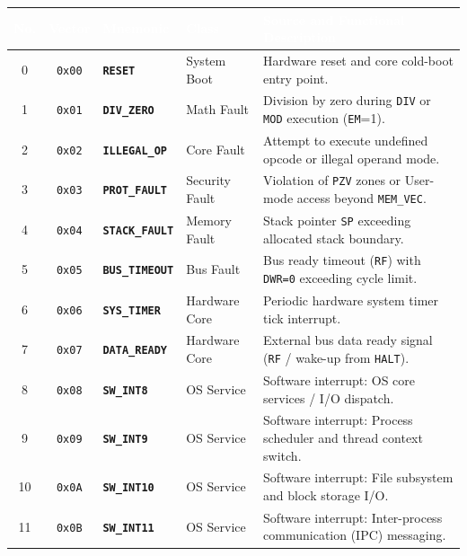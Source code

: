 \documentclass[11pt,a4paper]{article}
\renewcommand{\arraystretch}{1.25}
\begin{document}
\vspace{1mm}
\noindent
\begin{minipage}{\textwidth}
\centering
\footnotesize
\renewcommand{\arraystretch}{0.91}
\noindent
\begin{tabularx}{\textwidth}{c c l l X}
\toprule
\rowcolor{limslate}
\textcolor{white}{\textbf{No.}} & \textcolor{white}{\textbf{Vector}} & \textcolor{white}{\textbf{Mnemonic}} & \textcolor{white}{\textbf{Class}} & \textcolor{white}{\textbf{Source and Functional Description}} \\
\midrule
\rowcolors{2}{limroweven}{white}
0 & \texttt{0x00} & \textbf{\texttt{RESET}} & System Boot & Hardware reset and core cold-boot entry point. \\
1 & \texttt{0x01} & \textbf{\texttt{DIV\_ZERO}} & Math Fault & Division by zero during \texttt{DIV} or \texttt{MOD} execution (\texttt{EM}=1). \\
2 & \texttt{0x02} & \textbf{\texttt{ILLEGAL\_OP}} & Core Fault & Attempt to execute undefined opcode or illegal operand mode. \\
3 & \texttt{0x03} & \textbf{\texttt{PROT\_FAULT}} & Security Fault & Violation of \texttt{PZV} zones or User-mode access beyond \texttt{MEM\_VEC}. \\
4 & \texttt{0x04} & \textbf{\texttt{STACK\_FAULT}} & Memory Fault & Stack pointer \texttt{SP} exceeding allocated stack boundary. \\
5 & \texttt{0x05} & \textbf{\texttt{BUS\_TIMEOUT}} & Bus Fault & Bus ready timeout (\texttt{RF}) with \texttt{DWR=0} exceeding cycle limit. \\
6 & \texttt{0x06} & \textbf{\texttt{SYS\_TIMER}} & Hardware Core & Periodic hardware system timer tick interrupt. \\
7 & \texttt{0x07} & \textbf{\texttt{DATA\_READY}} & Hardware Core & External bus data ready signal (\texttt{RF} / wake-up from \texttt{HALT}). \\
8 & \texttt{0x08} & \textbf{\texttt{SW\_INT8}} & OS Service & Software interrupt: OS core services / I/O dispatch. \\
9 & \texttt{0x09} & \textbf{\texttt{SW\_INT9}} & OS Service & Software interrupt: Process scheduler and thread context switch. \\
10 & \texttt{0x0A} & \textbf{\texttt{SW\_INT10}} & OS Service & Software interrupt: File subsystem and block storage I/O. \\
11 & \texttt{0x0B} & \textbf{\texttt{SW\_INT11}} & OS Service & Software interrupt: Inter-process communication (IPC) messaging. \\

\end{tabularx}
\end{minipage}
\end{document}
